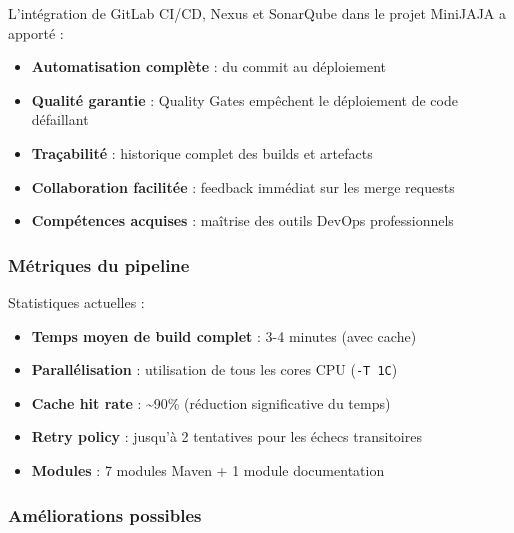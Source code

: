 L'intégration de GitLab CI/CD, Nexus et SonarQube dans le projet MiniJAJA a apporté :
\begin{itemize}
    \item \textbf{Automatisation complète} : du commit au déploiement
    \item \textbf{Qualité garantie} : Quality Gates empêchent le déploiement de code défaillant
    \item \textbf{Traçabilité} : historique complet des builds et artefacts
    \item \textbf{Collaboration facilitée} : feedback immédiat sur les merge requests
    \item \textbf{Compétences acquises} : maîtrise des outils DevOps professionnels
\end{itemize}

\subsubsection{Métriques du pipeline}

Statistiques actuelles :
\begin{itemize}
    \item \textbf{Temps moyen de build complet} : 3-4 minutes (avec cache)
    \item \textbf{Parallélisation} : utilisation de tous les cores CPU (\texttt{-T 1C})
    \item \textbf{Cache hit rate} : \textasciitilde90\% (réduction significative du temps)
    \item \textbf{Retry policy} : jusqu'à 2 tentatives pour les échecs transitoires
    \item \textbf{Modules} : 7 modules Maven + 1 module documentation
\end{itemize}

\subsubsection{Améliorations possibles}

